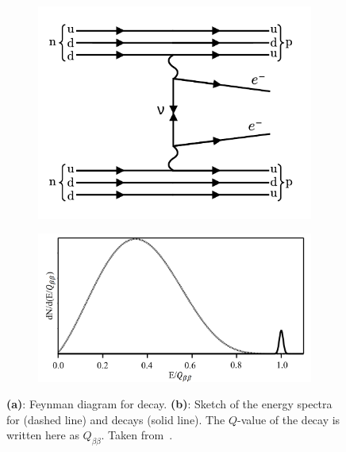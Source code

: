 \begin{figure}[!th]
    \centering
    \begin{subfigure}{0.40\textwidth}
        \centering
        \includegraphics[width=0.95\linewidth]{1_NeutrinoTheory/Figs/feynman_diag_ovbb.pdf}
        \caption{}
        \label{fig:feynman_diagram_ovbb}
    \end{subfigure}
    \begin{subfigure}{0.59\textwidth}
        \centering
        \includegraphics[width=\linewidth]{1_NeutrinoTheory/Figs/0vbb_2vbb_energy_spectrum_comparison.png}
        \caption{}
        \label{fig:energy_spectrum_bb}
    \end{subfigure}
    \caption[]
    {\textbf{(a)}: Feynman diagram for \onbb{} decay. \textbf{(b)}: Sketch of the energy spectra for \twonbb{} (dashed line) and \onbb{} decays (solid line). The $Q$-value of the decay is written here as $Q_{\beta\beta}$. Taken from~\cite{inacioDataAnalysisWater2022}.}
    \label{fig:ovbb_plots}
\end{figure}

